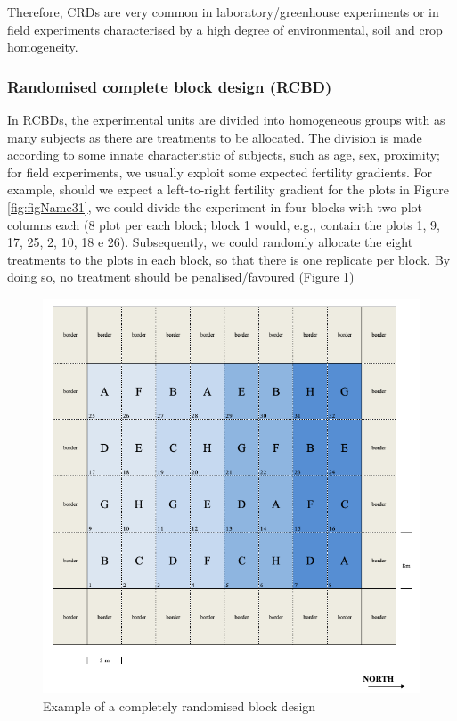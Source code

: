 \documentclass[a4paper,12pt,oneside]{book}
\begin{document}
Therefore, CRDs are very common in laboratory/greenhouse experiments or in field experiments characterised by a high degree of environmental, soil and crop homogeneity.

\hypertarget{randomised-complete-block-design-rcbd}{%
\subsubsection{Randomised complete block design (RCBD)}\label{randomised-complete-block-design-rcbd}}

In RCBDs, the experimental units are divided into homogeneous groups with as many subjects as there are treatments to be allocated. The division is made according to some innate characteristic of subjects, such as age, sex, proximity; for field experiments, we usually exploit some expected fertility gradients. For example, should we expect a left-to-right fertility gradient for the plots in Figure \ref{fig:figName31}, we could divide the experiment in four blocks with two plot columns each (8 plot per each block; block 1 would, e.g., contain the plots 1, 9, 17, 25, 2, 10, 18 e 26). Subsequently, we could randomly allocate the eight treatments to the plots in each block, so that there is one replicate per block. By doing so, no treatment should be penalised/favoured (Figure \ref{fig:figName34})

\begin{figure}

{\centering \includegraphics[width=0.97\linewidth]{_images/Mappa1CRBD} 

}

\caption{Example of a completely randomised block design}\label{fig:figName34}
\end{figure}
\end{document}
